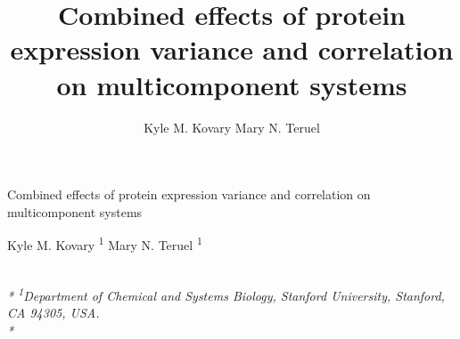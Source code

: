 \documentclass[11pt,]{article}
\title{Combined effects of protein expression variance and correlation on
multicomponent systems}
\author{
Kyle M. Kovary
Mary N. Teruel
}
\date{}
\begin{document}
\begin{singlespace}
\begin{center}
\huge Combined effects of protein expression variance and correlation on
multicomponent systems
\end{center}
\begin{center}
\large
Kyle M. Kovary \textsuperscript{1} 
Mary N. Teruel \textsuperscript{1} 
\end{center}
\begin{justify}
\footnotesize \emph{ 
\\*
\textsuperscript{1}Department of Chemical and Systems Biology, Stanford University,
Stanford, CA 94305, USA.\\*
}
\setcounter{num}{1}
\\[0.1cm]
\footnotesize \emph{ 
}
\end{justify}
\normalsize


\end{singlespace}
\end{document}
